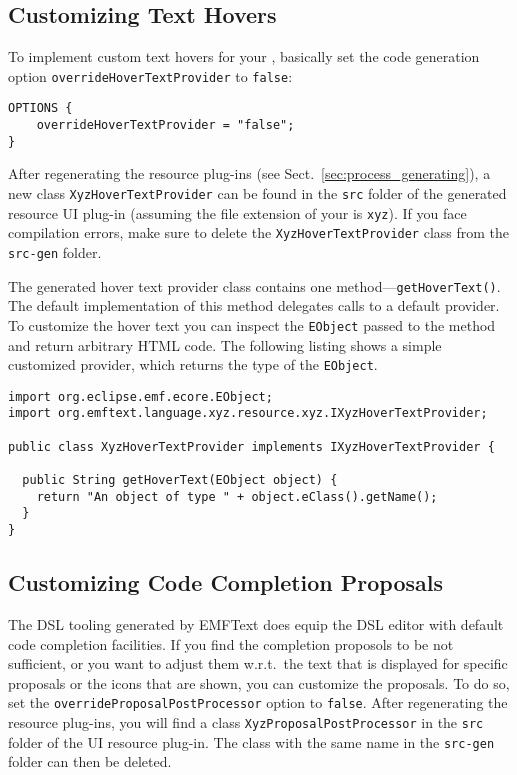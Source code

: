\subsection{Customizing Text Hovers}

To implement custom text hovers for your \DSL, basically set the code
generation option \texttt{overrideHoverTextProvider} to \texttt{false}:

\begin{lstlisting}
OPTIONS {
    overrideHoverTextProvider = "false";
}
\end{lstlisting}

After regenerating the resource plug-ins (see
Sect.~\ref{sec:process_generating}), a new class
\texttt{XyzHoverTextProvider} can be found in the \texttt{src} folder of the
generated resource UI plug-in (assuming the file extension of your \DSL is \texttt{xyz}).
If you face compilation errors, make sure to delete the \texttt{XyzHoverTextProvider} 
class from the \texttt{src-gen} folder.

The generated hover text provider class contains one
method---\texttt{getHoverText()}. The default implementation of this
method delegates calls to a default provider. To customize the
hover text you can inspect the \texttt{EObject} passed to the method and return arbitrary HTML code. The
following listing shows a simple customized provider, which returns the type of
the \texttt{EObject}.

\begin{lstlisting}
import org.eclipse.emf.ecore.EObject;
import org.emftext.language.xyz.resource.xyz.IXyzHoverTextProvider;

public class XyzHoverTextProvider implements IXyzHoverTextProvider {
	
  public String getHoverText(EObject object) {
    return "An object of type " + object.eClass().getName();
  }
}
\end{lstlisting}

\subsection{Customizing Code Completion Proposals}
\label{sec:cust_code_completion}

The DSL tooling generated by EMFText does equip the DSL editor with default code
completion facilities. If you find the completion proposols to be not
sufficient, or you want to adjust them w.r.t.~the text that is displayed for
specific proposals or the icons that are shown, you can customize the proposals.
To do so, set the \texttt{overrideProposalPostProcessor} option to \texttt{false}. 
After regenerating the resource plug-ins, you will find a class
\texttt{XyzProposalPostProcessor} in the \texttt{src} folder of the UI resource
plug-in. The class with the same name in the \texttt{src-gen} folder can then be
deleted.


